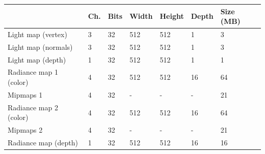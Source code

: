 \begin{table}[!h]
\centering
\begin{tabular}{p{3cm}lllll|l|}
\cline{2-7}
\multicolumn{1}{l|}{}                        & \multicolumn{1}{l|}{\textbf{Ch.}} & \multicolumn{1}{l|}{\textbf{Bits}} & \multicolumn{1}{l|}{\textbf{Width}} & \multicolumn{1}{l|}{\textbf{Height}} & \textbf{Depth} & \textbf{Size (MB)} \\ \hline
\multicolumn{1}{|l|}{Light map (vertex)}     & \multicolumn{1}{l|}{3}                 & \multicolumn{1}{l|}{32}                      & \multicolumn{1}{l|}{512}            & \multicolumn{1}{l|}{512}             & 1              & 3                  \\ \hline
\multicolumn{1}{|l|}{Light map (normals)}    & \multicolumn{1}{l|}{3}                 & \multicolumn{1}{l|}{32}                      & \multicolumn{1}{l|}{512}            & \multicolumn{1}{l|}{512}             & 1              & 3                  \\ \hline
\multicolumn{1}{|l|}{Light map (depth)}      & \multicolumn{1}{l|}{1}                 & \multicolumn{1}{l|}{32}                      & \multicolumn{1}{l|}{512}            & \multicolumn{1}{l|}{512}             & 1              & 1                  \\ \hline
\multicolumn{1}{|l|}{Radiance map 1 (color)} & \multicolumn{1}{l|}{4}                 & \multicolumn{1}{l|}{32}                      & \multicolumn{1}{l|}{512}            & \multicolumn{1}{l|}{512}             & 16             & 64                 \\ \hline
\multicolumn{1}{|l|}{Mipmaps 1}              & \multicolumn{1}{l|}{4}                 & \multicolumn{1}{l|}{32}                      & \multicolumn{1}{l|}{-}              & \multicolumn{1}{l|}{-}               & -              & 21                 \\ \hline
\multicolumn{1}{|l|}{Radiance map 2 (color)} & \multicolumn{1}{l|}{4}                 & \multicolumn{1}{l|}{32}                      & \multicolumn{1}{l|}{512}            & \multicolumn{1}{l|}{512}             & 16             & 64                 \\ \hline
\multicolumn{1}{|l|}{Mipmaps 2}              & \multicolumn{1}{l|}{4}                 & \multicolumn{1}{l|}{32}                      & \multicolumn{1}{l|}{-}              & \multicolumn{1}{l|}{-}               & -              & 21                 \\ \hline
\multicolumn{1}{|l|}{Radiance map (depth)}   & \multicolumn{1}{l|}{1}                 & \multicolumn{1}{l|}{32}                      & \multicolumn{1}{l|}{512}            & \multicolumn{1}{l|}{512}             & 16             & 16                 \\ \hline

\end{tabular}
\end{table}
